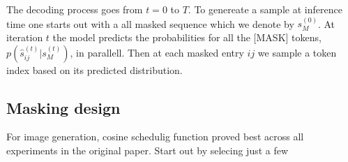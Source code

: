 \documentclass[../../thesis.tex]{subfiles}
\begin{document}
The decoding process goes from $t = 0$ to $T$. To genereate a sample at inference time one starts out with a all masked sequence which we denote by $s_M^{(0)}$. At iteration $t$ the model predicts the probabilities for all the [MASK] tokens, $p(\hat{s}_{ij}^{(t)}|s_M^{(t)})$, in parallell. Then at each masked entry $ij$ we sample a token index based on its predicted distribution.  

\subsection{Masking design}

For image generation, cosine schedulig function proved best across all experiments in the original paper. Start out by selecing just a few 
\end{document}
